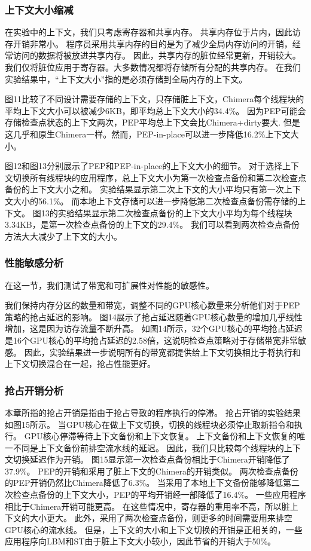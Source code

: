 \subsubsection{上下文大小缩减}

在实验中的上下文，我们只考虑寄存器和共享内存。
共享内存位于片内，因此访存开销非常小。
程序员采用共享内存的目的是为了减少全局内存访问的开销，经常访问的数据将被放进共享内存。
因此，共享内存的脏位经常更新，开销较大。
我们仅将脏位应用于寄存器。大多数情况都将存储所有分配的共享内存。
在我们实验结果中，“上下文大小”指的是必须存储到全局内存的上下文。

图11比较了不同设计需要存储的上下文，只存储脏上下文，Chimera每个线程块的平均上下文大小可以被减少6KB，即平均总上下文大小的34.4\%。
因为PEP可能会存储检查点状态的上下文两次，PEP平均总上下文会比Chimera+dirty要大.
但是这几乎和原生Chimera一样。然而，PEP-in-place可以进一步降低16.2\%上下文大小。

图12和图13分别展示了PEP和PEP-in-place的上下文大小的细节。
对于选择上下文切换所有线程块的应用程序，总上下文大小为第一次检查点备份和第二次检查点备份的上下文大小之和。
实验结果显示第二次上下文的大小平均只有第一次上下文大小的56.1\%。
而本地上下文存储可以进一步降低第二次检查点备份需存储的上下文。
图13的实验结果显示第二次检查点备份的上下文大小平均为每个线程块3.34KB，是第一次检查点备份的上下文的29.4\%。
我们可以看到两次检查点备份方法大大减少了上下文的大小。

\subsubsection{性能敏感分析}

在这一节，我们测试了带宽和可扩展性对性能的敏感性。

我们保持内存分区的数量和带宽，调整不同的GPU核心数量来分析他们对于PEP策略的抢占延迟的影响。
图14展示了抢占延迟随着GPU核心数量的增加几乎线性增加，这是因为访存流量不断升高。
如图14所示，32个GPU核心的平均抢占延迟是16个GPU核心的平均抢占延迟的2.58倍，这说明检查点策略对于存储带宽非常敏感。
因此，实验结果进一步说明所有的带宽都提供给上下文切换相比于将执行和上下文切换混合在一起，抢占性能更好。

\subsubsection{抢占开销分析}

本章所指的抢占开销是指由于抢占导致的程序执行的停滞。
抢占开销的实验结果如图15所示。
当GPU核心在做上下文切换，切换的线程块必须停止取新指令和执行。
GPU核心停滞等待上下文备份和上下文恢复。
上下文备份和上下文恢复的唯一不同是上下文备份前排空流水线的延迟。
因此，我们只比较每个线程块的上下文切换延迟作为开销。
图15显示第一次检查点备份相比于Chimera开销降低了37.9\%。
PEP的开销和采用了脏上下文的Chimera的开销类似。
两次检查点备份的PEP开销仍然比Chimera降低了6.3\%。
当采用了本地上下文备份能够降低第二次检查点备份的上下文大小，PEP的平均开销经一部降低了16.4\%。
一些应用程序相比于Chimera开销可能更高。
在这些情况中，寄存器的重用率不高，所以脏上下文的大小更大。
此外，采用了两次检查点备份，则更多的时间需要用来排空GPU核心的流水线。
但是，上下文的大小和上下文切换的开销是正相关的，一些应用程序向LBM和ST由于脏上下文大小较小，因此节省的开销大于50\%。

